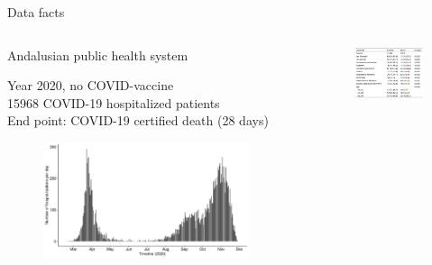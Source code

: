 \documentclass[compress,ignorenonframetext,aspectratio=1610,handout]{beamer}
\begin{document}
\begin{frame}{Data facts}

	\begin{columns}
		\begin{column}{0.55\textwidth}
			Andalusian public health system

			Year 2020, no COVID-vaccine \\

			15968 COVID-19 hospitalized patients \\

			End point: COVID-19 certified death (28 days) 

			\begin{figure}
				\includegraphics[width=0.94\textwidth]{figs/results/hospitalizations_timeline.pdf}
			\end{figure}

		\end{column}

		\begin{column}{0.45\textwidth}
		\begin{figure}
			\includegraphics[width=0.99\textwidth]{figs/results/covariates.png}
		\end{figure}

		\end{column}


	\end{columns}

	
\end{frame}
\end{document}
